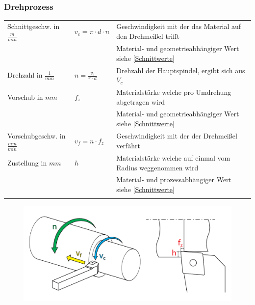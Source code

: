 \documentclass{\basedir/fablab-document}
\begin{document}
\subsubsection{Drehprozess}
\begin{tabular}{lll}
    Schnittgeschw. in $\frac{m}{min}$ 					& $v_c = \pi \cdot d \cdot n $ 			& Geschwindigkeit mit der das Material auf den Drehmeißel trifft 	\\ 
																								&																		& Material- und geometrieabhängiger Wert siehe \ref{Schnittwerte} \\ \addlinespace
		Drehzahl in $\frac{1}{min}$ 								& $ n = \frac{v_c}{\pi \cdot d} $		& Drehzahl der Hauptspindel, ergibt sich aus $V_c$								\\ \addlinespace
		Vorschub in $mm$ 														& $ f_z $  													& Materialstärke welche pro Umdrehung abgetragen wird 						\\
																								&																		& Material- und geometrieabhängiger Wert siehe \ref{Schnittwerte} \\ \addlinespace
		Vorschubgeschw. in $\frac{mm}{min}$ 				& $ v_f = n \cdot f_z $ 						& Geschwindigkeit mit der der Drehmeißel verfährt			 						\\ \addlinespace
		Zustellung in $mm$ 													& $ h  $  													& Materialstärke welche auf einmal vom Radius weggenommen wird		\\
																								&																		& Material- und prozessabhängiger Wert siehe \ref{Schnittwerte} 	\\ \addlinespace
\end{tabular}

\begin{figure}[ht]
\centering
\includegraphics[width = 0.9\linewidth]{img/drehprozess}
\end{figure}
\end{document}
